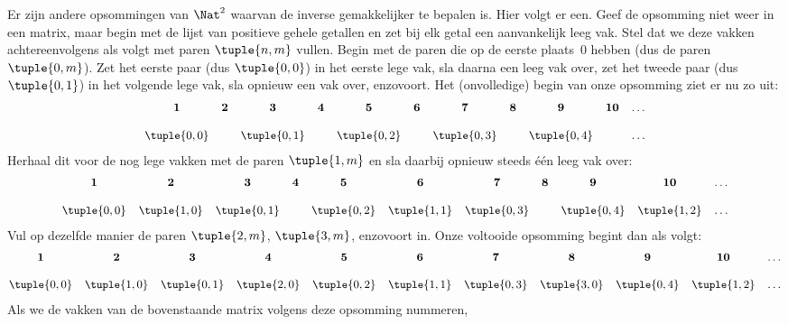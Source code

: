 \documentclass[openany]{memoir}
\begin{document}
\begin{explain}
Er zijn andere opsommingen van $\Nat^2$ waarvan de inverse gemakkelijker te
bepalen is. Hier volgt er een. Geef de opsomming niet weer in een matrix, maar
begin met de lijst van positieve gehele getallen en zet bij elk getal een
aanvankelijk leeg vak. Stel dat we deze vakken achtereenvolgens als volgt met
paren $\tuple{n,m}$ vullen. Begin met de paren die op de eerste plaats~$0$
hebben (dus de paren $\tuple{0,m}$). Zet het eerste paar (dus
$\tuple{0,0}$) in het eerste lege vak, sla daarna een leeg vak over, zet het
tweede paar (dus $\tuple{0,1}$) in het volgende lege vak, sla opnieuw een vak
over, enzovoort. Het (onvolledige) begin van onze opsomming ziet er nu zo uit:
\[\small
\begin{array}{@{}c c c c c c c c c c c@{}}
\mathbf 1 & \mathbf 2 & \mathbf 3 & \mathbf 4 & \mathbf 5 & \mathbf 6 & \mathbf 7 & \mathbf 8 & \mathbf 9 & \mathbf{10} & \dots \\ \\
\tuple{0,0} &  & \tuple{0,1} &  & \tuple{0,2} &  & \tuple{0,3} & & \tuple{0,4} &  & \dots \\
\end{array}
\]
Herhaal dit voor de nog lege vakken met de paren $\tuple{1,m}$ en sla daarbij
opnieuw steeds één leeg vak over:
\[\small
\begin{array}{@{}c c c c c c c c c c c@{}}
\mathbf 1 & \mathbf 2 & \mathbf 3 & \mathbf 4 & \mathbf 5 & \mathbf 6 & \mathbf 7 & \mathbf 8 & \mathbf 9 & \mathbf{10} & \dots \\ \\
\tuple{0,0} & \tuple{1,0} & \tuple{0,1} &  & \tuple{0,2} & \tuple{1,1} & 
\tuple{0,3} & & \tuple{0,4} &  \tuple{1,2} & \dots \\
\end{array}
\]
Vul op dezelfde manier de paren $\tuple{2,m}$, $\tuple{3,m}$, enzovoort in.
Onze voltooide opsomming begint dan als volgt:
\[\small
\begin{array}{@{}cc c c c c c c c c c@{}}
\mathbf 1 & \mathbf 2 & \mathbf 3 & \mathbf 4 & \mathbf 5 & \mathbf 6 & \mathbf 7 & \mathbf 8 & \mathbf 9 & \mathbf{10} & \dots \\ \\
\tuple{0,0} & \tuple{1,0} & \tuple{0,1} & \tuple{2,0}  & \tuple{0,2} & 
\tuple{1,1} & \tuple{0,3} & \tuple{3,0}  & \tuple{0,4} &  \tuple{1,2} & \dots \\
\end{array}
\]
Als we de vakken van de bovenstaande matrix volgens deze opsomming nummeren,

\end{explain}
\end{document}
